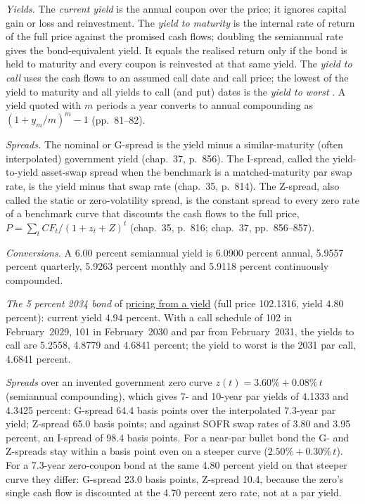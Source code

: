 \begin{qfdefinition}\label{def:bond-yield-spread-measures}
 \emph{Yields.} The \emph{current yield} is the annual coupon over the price; it ignores capital gain or loss and reinvestment. The \emph{yield to maturity} is the internal rate of return of the full price against the promised cash flows; doubling the semiannual rate gives the bond-equivalent yield. It equals the realised return only if the bond is held to maturity and every coupon is reinvested at that same yield. The \emph{yield to call} uses the cash flows to an assumed call date and call price; the lowest of the yield to maturity and all yields to call (and put) dates is the \emph{yield to worst} \citep[chap.~4, pp.~76--84]{s7-fabozzifixed}. A yield quoted with $m$ periods a year converts to annual compounding as $(1+y_m/m)^m-1$ (pp.~81--82).

\emph{Spreads.} The nominal or G-spread is the yield minus a similar-maturity (often interpolated) government yield (chap.~37, p.~856). The I-spread, called the yield-to-yield asset-swap spread when the benchmark is a matched-maturity par swap rate, is the yield minus that swap rate (chap.~35, p.~814). The Z-spread, also called the static or zero-volatility spread, is the constant spread to every zero rate of a benchmark curve that discounts the cash flows to the full price, $P=\sum_t CF_t/(1+z_t+Z)^t$ (chap.~35, p.~816; chap.~37, pp.~856--857).

 \emph{Conversions.} A 6.00 percent semiannual yield is 6.0900 percent annual, 5.9557 percent quarterly, 5.9263 percent monthly and 5.9118 percent continuously compounded.

\emph{The 5 percent 2034 bond} of \hyperref[meth:bond-price-from-yield]{pricing from a yield} (full price 102.1316, yield 4.80 percent): current yield 4.94 percent. With a call schedule of 102 in February~2029, 101 in February~2030 and par from February~2031, the yields to call are 5.2558, 4.8779 and 4.6841 percent; the yield to worst is the 2031 par call, 4.6841 percent.

\emph{Spreads} over an invented government zero curve $z(t)=3.60\%+0.08\%\,t$ (semiannual compounding), which gives 7- and 10-year par yields of 4.1333 and 4.3425 percent: G-spread 64.4 basis points over the interpolated 7.3-year par yield; Z-spread 65.0 basis points; and against SOFR swap rates of 3.80 and 3.95 percent, an I-spread of 98.4 basis points. For a near-par bullet bond the G- and Z-spreads stay within a basis point even on a steeper curve ($2.50\%+0.30\%\,t$). For a 7.3-year zero-coupon bond at the same 4.80 percent yield on that steeper curve they differ: G-spread 23.0 basis points, Z-spread 10.4, because the zero's single cash flow is discounted at the 4.70 percent zero rate, not at a par yield.


\end{qfdefinition}

